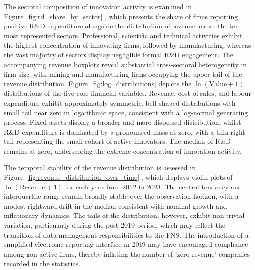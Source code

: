 \documentclass[a4paper, 12pt]{article}
\begin{document}
The sectoral composition of innovation activity is examined in Figure~\ref{fig:rd_share_by_sector} \hypertarget{target:rd_share_by_sector}{}, which presents the share of firms reporting positive R\&D expenditure alongside the distribution of revenue across the ten most represented sectors. Professional, scientific and technical activities exhibit the highest concentration of innovating firms, followed by manufacturing, whereas the vast majority of sectors display negligible formal R\&D engagement. The accompanying revenue boxplots reveal substantial cross-sectoral heterogeneity in firm size, with mining and manufacturing firms occupying the upper tail of the revenue distribution. Figure~\ref{fig:log_distributions} \hypertarget{target:log_distributions}{} depicts the $\ln(\text{Value} + 1)$ distributions of the five core financial variables. Revenue, cost of sales, and labour expenditure exhibit approximately symmetric, bell-shaped distributions with small tail near zero in logarithmic space, consistent with a log-normal generating process. Fixed assets display a broader and more dispersed distribution, whilst R\&D expenditure is dominated by a pronounced mass at zero, with a thin right tail representing the small cohort of active innovators. The median of R\&D remains at zero, underscoring the extreme concentration of innovation activity.

The temporal stability of the revenue distribution is assessed in Figure~\ref{fig:revenue_distribution_over_time} \hypertarget{target:revenue_distribution_over_time}{}, which displays violin plots of $\ln(\text{Revenue} + 1)$ for each year from 2012 to 2023. The central tendency and interquartile range remain broadly stable over the observation horizon, with a modest rightward drift in the median consistent with nominal growth and inflationary dynamics. The tails of the distribution, however, exhibit non-trivial variation, particularly during the post-2019 period, which may reflect the transition of data management responsibilities to the FNS. The introduction of a simplified electronic reporting interface in 2019 may have encouraged compliance among non-active firms, thereby inflating the number of 'zero-revenue' companies recorded in the statistics.
\end{document}

